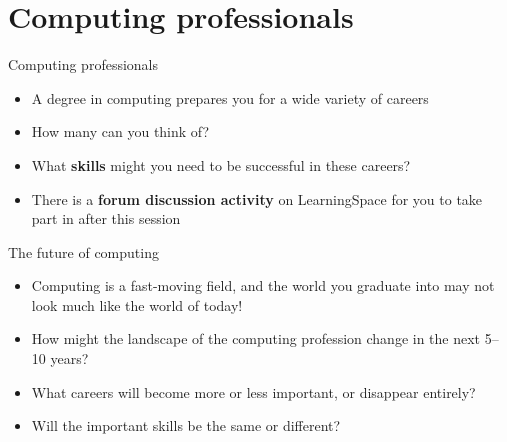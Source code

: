 \part{Computing professionals}
\frame{\partpage}

\begin{frame}{Computing professionals}
	\begin{itemize}
		\pause\item A degree in computing prepares you for a wide variety of careers
		\pause\item How many can you think of?
		\pause\item What \textbf{skills} might you need to be successful in these careers?
		\pause\item There is a \textbf{forum discussion activity} on LearningSpace for you to take part in after this session
	\end{itemize}
\end{frame}

\begin{frame}{The future of computing}
	\begin{itemize}
		\pause\item Computing is a fast-moving field, and the world you graduate into may not look much like the world of today!
		\pause\item How might the landscape of the computing profession change in the next 5--10 years?
		\pause\item What careers will become more or less important, or disappear entirely?
		\pause\item Will the important skills be the same or different?
	\end{itemize}
\end{frame}
